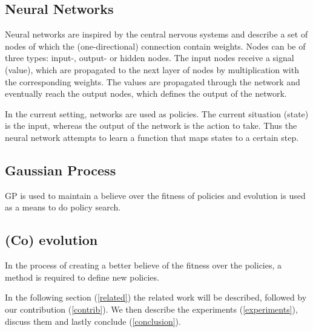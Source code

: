 \subsection{Neural Networks}
Neural networks are inspired by the central nervous systems and describe a set of nodes of which the (one-directional) connection contain weights. Nodes can be of three types: input-, output- or hidden nodes. The input nodes receive a signal (value), which are propagated to the next layer of nodes by multiplication with the corresponding weights. The values are propagated through the network and eventually reach the output nodes, which defines the output of the network. 

In the current setting, networks are used as policies. The current situation (state) is the input, whereas the output of the network is the action to take. Thus the neural network attempts to learn a function that maps states to a certain step.

\subsection{Gaussian Process}

GP is used to maintain a believe over the fitness of policies and evolution is used as a means to do policy search.

\subsection{(Co) evolution}
In the process of creating a better believe of the fitness over the policies, a method is required to define new policies. 


In the following section (\ref{related}) the related work will be described, followed by our contribution (\ref{contrib}). We then describe the experiments (\ref{experiments}), discuss them and lastly conclude (\ref{conclusion}).

